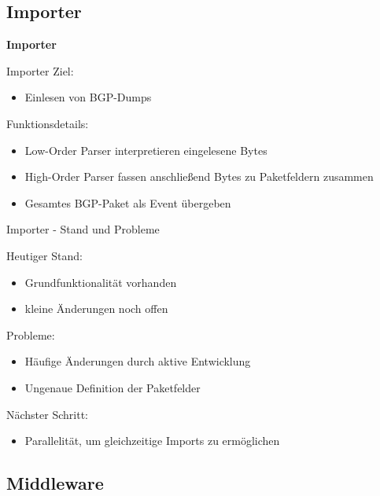 \documentclass[9pt]{beamer}
\begin{document}
\subsection{Importer}

\begin{frame}{}
	\begin{center}
		\LARGE \textbf{Importer}
	\end{center}
\end{frame}

\begin{frame}{Importer}{}
   Ziel:
   	\begin{itemize}
   	\item Einlesen von BGP-Dumps
   	\end{itemize}
   	\vspace{0,2cm}
   Funktionsdetails:
	\begin{itemize}
		\item Low-Order Parser interpretieren eingelesene Bytes
		\item High-Order Parser fassen anschließend Bytes zu Paketfeldern zusammen
		\item Gesamtes BGP-Paket als Event übergeben
	\end{itemize}
\end{frame}

\begin{frame}{Importer - Stand und Probleme}{}

	Heutiger Stand:
	\begin{itemize}
		\item Grundfunktionalität vorhanden
		\item kleine Änderungen noch offen
	\end{itemize}
	\vspace{0,2cm}
	Probleme:
	\begin{itemize}
		\item  Häufige Änderungen durch aktive Entwicklung
		\item Ungenaue Definition der Paketfelder
	\end{itemize}
	\vspace{0,2cm}
	Nächster Schritt:
	\begin{itemize}
		\item Parallelität, um gleichzeitige Imports zu ermöglichen
	\end{itemize}

\end{frame}

\subsection{Middleware}
\end{document}
